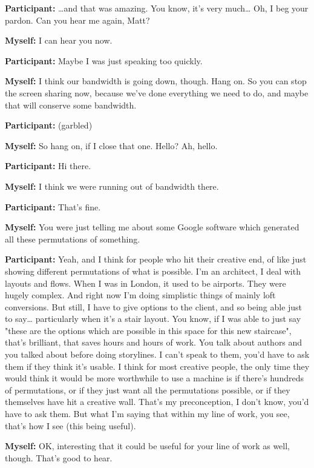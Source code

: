 \documentclass[11pt]{report}
\begin{document}
\begin{linenumbers}
\textbf{Participant:} \ldots{}and that was amazing. You know, it's very much\ldots{} Oh, I beg your pardon. Can you hear me again, Matt?

\textbf{Myself:} I can hear you now.

\textbf{Participant:} Maybe I was just speaking too quickly.

\textbf{Myself:} I think our bandwidth is going down, though. Hang on. So you can stop the screen sharing now, because we've done everything we need to do, and maybe that will conserve some bandwidth.

\textbf{Participant:} (garbled)

\textbf{Myself:} So hang on, if I close that one. Hello? Ah, hello.

\textbf{Participant:} Hi there.

\textbf{Myself:} I think we were running out of bandwidth there.

\textbf{Participant:} That's fine.

\textbf{Myself:} You were just telling me about some Google software which generated all these permutations of something.

\textbf{Participant:} Yeah, and I think for people who hit their creative end, of like just showing different permutations of what is possible. I'm an architect, I deal with layouts and flows. When I was in London, it used to be airports. They were hugely complex. And right now I'm doing simplistic things of mainly loft conversions. But still, I have to give options to the client, and so being able just to say\ldots{} particularly when it's a stair layout. You know, if I was able to just say "these are the options which are possible in this space for this new staircase", that's brilliant, that saves hours and hours of work. You talk about authors and you talked about before doing storylines. I can't speak to them, you'd have to ask them if they think it's usable. I think for most creative people, the only time they would think it would be more worthwhile to use a machine is if there's hundreds of permutations, or if they just want all the permutations possible, or if they themselves have hit a creative wall. That's my preconception, I don't know, you'd have to ask them. But what I'm saying that within my line of work, you see, that's how I see (this being useful).

\textbf{Myself:} OK, interesting that it could be useful for your line of work as well, though. That's good to hear.


\end{linenumbers}
\end{document}
